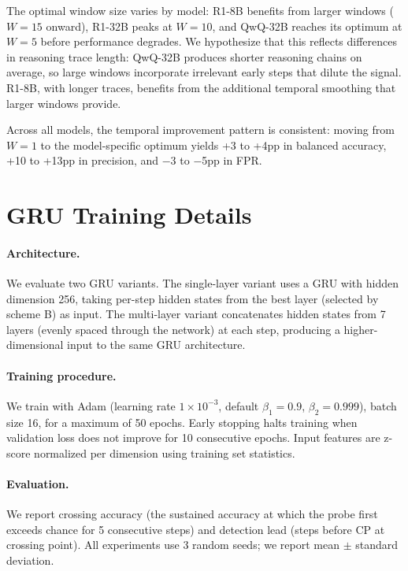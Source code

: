 The optimal window size varies by model: R1-8B benefits from larger windows ($W{=}15$ onward), R1-32B peaks at $W{=}10$, and QwQ-32B reaches its optimum at $W{=}5$ before performance degrades. We hypothesize that this reflects differences in reasoning trace length: QwQ-32B produces shorter reasoning chains on average, so large windows incorporate irrelevant early steps that dilute the signal. R1-8B, with longer traces, benefits from the additional temporal smoothing that larger windows provide.

Across all models, the temporal improvement pattern is consistent: moving from $W{=}1$ to the model-specific optimum yields +3 to +4pp in balanced accuracy, +10 to +13pp in precision, and $-$3 to $-$5pp in FPR.


\section{GRU Training Details}
\label{app:gru_details}

\paragraph{Architecture.} We evaluate two GRU variants. The single-layer variant uses a GRU with hidden dimension 256, taking per-step hidden states from the best layer (selected by scheme B) as input. The multi-layer variant concatenates hidden states from 7 layers (evenly spaced through the network) at each step, producing a higher-dimensional input to the same GRU architecture.

\paragraph{Training procedure.} We train with Adam (learning rate $1 \times 10^{-3}$, default $\beta_1{=}0.9$, $\beta_2{=}0.999$), batch size 16, for a maximum of 50 epochs. Early stopping halts training when validation loss does not improve for 10 consecutive epochs. Input features are z-score normalized per dimension using training set statistics.

\paragraph{Evaluation.} We report crossing accuracy (the sustained accuracy at which the probe first exceeds chance for 5 consecutive steps) and detection lead (steps before CP at crossing point). All experiments use 3 random seeds; we report mean $\pm$ standard deviation.

